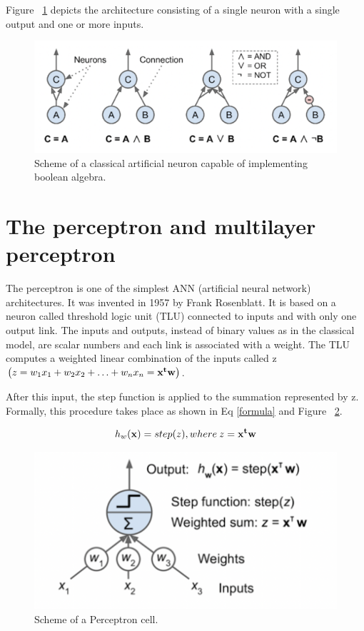 Figure ~\ref{fig:neuronsBasic} depicts the architecture consisting of a single neuron with a single output and one or more inputs.
\begin{figure} [h!]
    \centering
    \includegraphics [width=\textwidth,height=\textheight,keepaspectratio] {Assets/Theory_and_methods/unnamed.png}
    \caption{ Scheme of a classical artificial neuron capable of implementing boolean algebra.}
    \label{fig:neuronsBasic}
\end{figure}

\clearpage

\section{The perceptron and multilayer perceptron} \label{percy}
The perceptron is one of the simplest ANN (artificial neural network) architectures. It was invented in 1957 by Frank Rosenblatt. It is based on a neuron called threshold logic unit (TLU) connected to inputs and with only one output link. The inputs and outputs, instead of binary values as in the classical model, are scalar numbers and each link is associated with a weight. The TLU computes a weighted linear combination of the inputs called z $\left(z=w_{1} x_{1}+w_{2} x_{2}+\ldots+w_{n} x_{n}= {\bf x^{t} w}\right)$.

After this input, the step function is applied to the summation represented by z. Formally, this procedure takes place as shown in Eq \eqref{formula} and Figure ~\ref{fig:summatory}.

\begin{equation} 
    h_{w}({\bf x}) = step(z), where \:z = {\bf x^{t} w}
    \label{formula}
\end{equation} 

\begin{figure} [h!]
    \centering
   \includegraphics[width=\textwidth,height=\textheight,keepaspectratio]{Assets/Theory_and_methods/unnamed-2.png}
    \caption{Scheme of a Perceptron cell.}
    \label{fig:summatory}
\end{figure}

